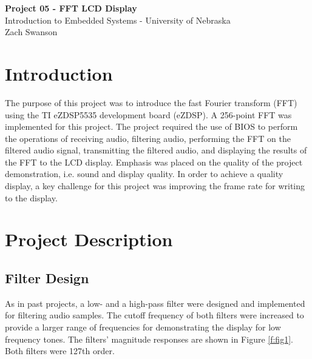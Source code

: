 \documentclass[11pt,pdftex,portrait,letterpaper]{article}
\begin{document}
\vspace*{30ex}
\begin{center}

\textbf{Project 05 - FFT LCD Display }\\

\vspace{4ex}
Introduction to Embedded Systems - University of Nebraska \\

\vspace{4ex}
Zach Swanson\\

\end{center}


\pagebreak
\tableofcontents
\pagebreak


\section{Introduction}

The purpose of this project was to introduce the fast Fourier transform (FFT) using the TI eZDSP5535 development board (eZDSP). A 256-point FFT was implemented for this project. The project required the use of BIOS to perform the operations of receiving audio, filtering audio, performing the FFT on the filtered audio signal, transmitting the filtered audio, and displaying the results of the FFT to the LCD display. Emphasis was placed on the quality of the project demonstration, i.e. sound and display quality. In order to achieve a quality display, a key challenge for this project was improving the frame rate for writing to the display.
 
\section{Project Description}

\subsection{Filter Design}

As in past projects, a low- and a high-pass filter were designed and implemented for filtering audio samples.  The cutoff frequency of both filters were increased to provide a larger range of frequencies for demonstrating the display for low frequency tones. The filters' magnitude responses are shown in Figure \ref{f:fig1}. Both filters were 127th order.
\end{document}
